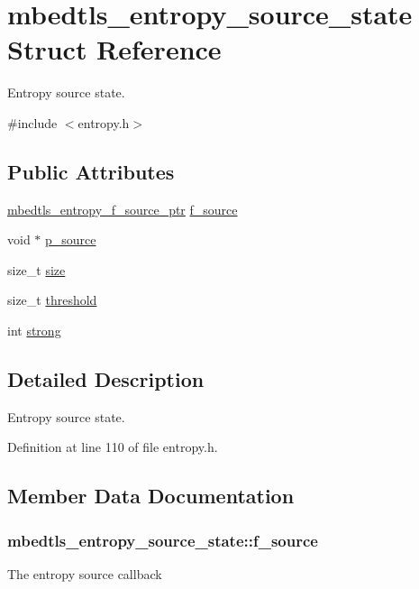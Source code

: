 \hypertarget{structmbedtls__entropy__source__state}{\section{mbedtls\-\_\-entropy\-\_\-source\-\_\-state Struct Reference}
\label{structmbedtls__entropy__source__state}
}


Entropy source state.  




{\ttfamily \#include $<$entropy.\-h$>$}

\subsection*{Public Attributes}
\begin{DoxyCompactItemize}
\item 
\hyperlink{entropy_8h_ac77904920528c196bc0a90c59ae100e4}{mbedtls\-\_\-entropy\-\_\-f\-\_\-source\-\_\-ptr} \hyperlink{structmbedtls__entropy__source__state_afa26f990bd3ae555a84bdee710fd5844}{f\-\_\-source}
\item 
void $\ast$ \hyperlink{structmbedtls__entropy__source__state_ac290f929e3382e26443b6625ab9a0d78}{p\-\_\-source}
\item 
size\-\_\-t \hyperlink{structmbedtls__entropy__source__state_a395d9641c3aa0cddd5b1977c9e2a6aba}{size}
\item 
size\-\_\-t \hyperlink{structmbedtls__entropy__source__state_ab5ac92f3c7acd5a47ee986fb915e9686}{threshold}
\item 
int \hyperlink{structmbedtls__entropy__source__state_a13f749f23a93d986357832477335ec83}{strong}
\end{DoxyCompactItemize}


\subsection{Detailed Description}
Entropy source state. 

Definition at line 110 of file entropy.\-h.



\subsection{Member Data Documentation}
\hypertarget{structmbedtls__entropy__source__state_afa26f990bd3ae555a84bdee710fd5844}{
\subsubsection[{f\-\_\-source}]{ mbedtls\-\_\-entropy\-\_\-source\-\_\-state\-::f\-\_\-source}}\label{structmbedtls__entropy__source__state_afa26f990bd3ae555a84bdee710fd5844}
The entropy source callback 

